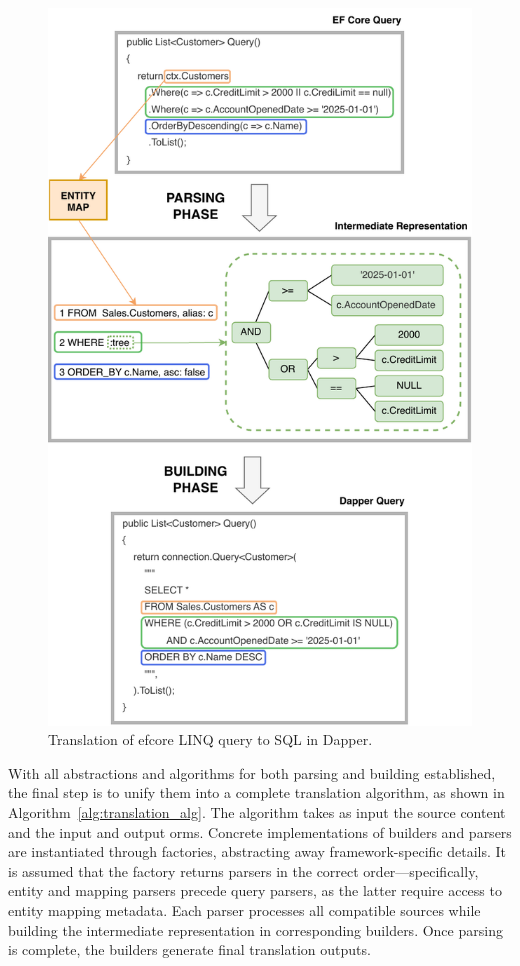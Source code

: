 \begin{figure}[!htp]
  \centering
  \includegraphics[scale=1]{thesis/img/thesis/04_parsing_building_queries.drawio.pdf}
  \caption{Translation of \acrshort{efcore} LINQ query to SQL in Dapper.}
  \label{fig:translation_complete_query}
\end{figure}

With all abstractions and algorithms for both parsing and building established, the final step is to unify them into a complete translation algorithm, as shown in Algorithm~\ref{alg:translation_alg}. The algorithm takes as input the source content and the input and output \acrshort{orm}s. Concrete implementations of builders and parsers are instantiated through factories, abstracting away framework-specific details. It is assumed that the factory returns parsers in the correct order—specifically, entity and mapping parsers precede query parsers, as the latter require access to entity mapping metadata. Each parser processes all compatible sources while building the intermediate representation in corresponding builders. Once parsing is complete, the builders generate final translation outputs.

